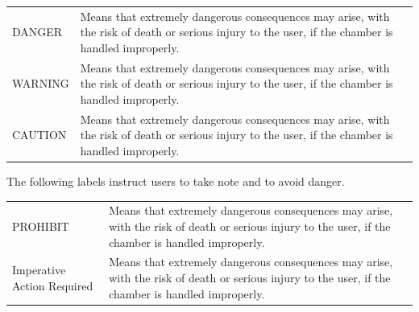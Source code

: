 \documentclass[11pt,twoside]{book}
\begin{document}
{{{\begin{longtable}[]{@{}ll@{}}
\toprule
\endhead
\begin{minipage}[t]{0.28\columnwidth}\raggedright
DANGER\strut
\end{minipage} & \begin{minipage}[t]{0.66\columnwidth}\raggedright
Means that extremely dangerous consequences may arise, with the risk of
death or serious injury to the user, if the chamber is handled
improperly.\strut
\end{minipage}\tabularnewline
\begin{minipage}[t]{0.28\columnwidth}\raggedright
WARNING\strut
\end{minipage} & \begin{minipage}[t]{0.66\columnwidth}\raggedright
Means that extremely dangerous consequences may arise, with the risk of
death or serious injury to the user, if the chamber is handled
improperly.\strut
\end{minipage}\tabularnewline
\begin{minipage}[t]{0.28\columnwidth}\raggedright
CAUTION\strut
\end{minipage} & \begin{minipage}[t]{0.66\columnwidth}\raggedright
Means that extremely dangerous consequences may arise, with the risk of
death or serious injury to the user, if the chamber is handled
improperly.\strut
\end{minipage}\tabularnewline
\bottomrule
\end{longtable}

The following labels instruct users to take note and to avoid danger.

\begin{longtable}[]{@{}ll@{}}
\toprule
\endhead
\begin{minipage}[t]{0.28\columnwidth}\raggedright
PROHIBIT\strut
\end{minipage} & \begin{minipage}[t]{0.66\columnwidth}\raggedright
Means that extremely dangerous consequences may arise, with the risk of
death or serious injury to the user, if the chamber is handled
improperly.\strut
\end{minipage}\tabularnewline
\begin{minipage}[t]{0.28\columnwidth}\raggedright
Imperative Action Required\strut
\end{minipage} & \begin{minipage}[t]{0.66\columnwidth}\raggedright
Means that extremely dangerous consequences may arise, with the risk of
death or serious injury to the user, if the chamber is handled
improperly.\strut
\end{minipage}\tabularnewline
\bottomrule
\end{longtable}

}}}
\end{document}
